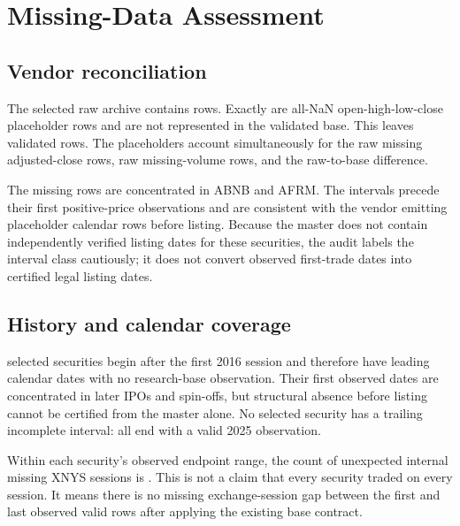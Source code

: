 \section{Missing-Data Assessment}

\subsection{Vendor reconciliation}

The selected raw archive contains \RawSelectedRows{} rows. Exactly
\PlaceholderRows{} are all-NaN open-high-low-close placeholder rows and are
not represented in the validated base. This leaves \SelectedObservations{}
validated rows. The placeholders account simultaneously for the raw missing
adjusted-close rows, raw missing-volume rows, and the raw-to-base difference.

The missing rows are concentrated in ABNB and AFRM. The intervals precede
their first positive-price observations and are consistent with the vendor
emitting placeholder calendar rows before listing. Because the master does not
contain independently verified listing dates for these securities, the audit
labels the interval class cautiously; it does not convert observed first-trade
dates into certified legal listing dates.

\begin{table}[tbp]
\centering
\caption{Missing-value intervals in the filtered raw archive}
\label{tab:missing-intervals}
\end{table}

\subsection{History and calendar coverage}

\IncompleteHistorySecurities{} selected securities begin after the first 2016
session and therefore have leading calendar dates with no research-base
observation. Their first observed dates are concentrated in later IPOs and
spin-offs, but structural absence before listing cannot be certified from the
master alone. No selected security has a trailing incomplete interval: all end
with a valid 2025 observation.

\noindent\begin{minipage}{\linewidth}
Within each security's observed endpoint range, the count of unexpected
internal missing XNYS sessions is \InternalCalendarGaps{}. This is not a claim
that every security traded on every session. It means there is no missing
exchange-session gap between the first and last observed valid rows after
applying the existing base contract.
\end{minipage}

